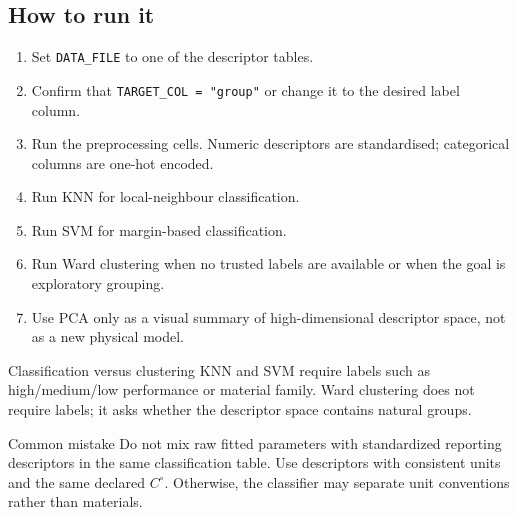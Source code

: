 \documentclass[journal=jacsat,manuscript=article]{achemso}
\begin{document}
\subsection*{How to run it}

\begin{enumerate}
	\item Set \texttt{DATA\_FILE} to one of the descriptor tables.
	\item Confirm that \texttt{TARGET\_COL = "group"} or change it to the
	desired label column.
	\item Run the preprocessing cells. Numeric descriptors are standardised;
	categorical columns are one-hot encoded.
	\item Run KNN for local-neighbour classification.
	\item Run SVM for margin-based classification.
	\item Run Ward clustering when no trusted labels are available or when the
	goal is exploratory grouping.
	\item Use PCA only as a visual summary of high-dimensional descriptor
	space, not as a new physical model.
\end{enumerate}

\begin{greenbox}{Classification versus clustering}
	KNN and SVM require labels such as high/medium/low performance or
	material family. Ward clustering does not require labels; it asks whether
	the descriptor space contains natural groups.
\end{greenbox}

\begin{redbox}{Common mistake}
	Do not mix raw fitted parameters with standardized reporting descriptors in the same
	classification table. Use descriptors with consistent units and the same
	declared \(C^\circ\). Otherwise, the classifier may separate unit
	conventions rather than materials.
\end{redbox}


\nocite{langmuir_adsorption_1918}

\end{document}
